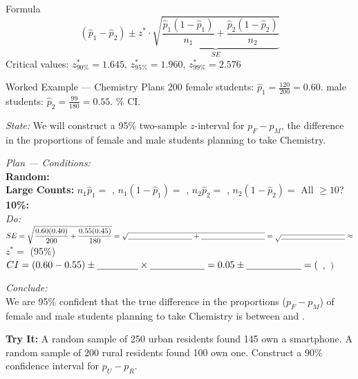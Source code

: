 \documentclass[10pt]{article}
\begin{document}
\begin{notesbox}{Formula}
\[(\hat p_1 - \hat p_2) \pm z^* \cdot \underbrace{\sqrt{\dfrac{\hat p_1(1-\hat p_1)}{n_1}
    + \dfrac{\hat p_2(1-\hat p_2)}{n_2}}}_{SE}\]
\vspace{4pt}
Critical values: $z^*_{90\%}=1.645$, \quad $z^*_{95\%}=1.960$, \quad $z^*_{99\%}=2.576$
\end{notesbox}

\begin{notesbox}{Worked Example --- Chemistry Plans}
200 female students: $\hat p_1 = \frac{120}{200} = 0.60$.  male students: $\hat p_2 = \frac{99}{180} = 0.55$. \% CI.

\textit{State:} We will construct a 95\% two-sample $z$-interval for $p_F - p_M$, the difference
in the proportions of female and male students planning to take Chemistry.

\textit{Plan --- Conditions:}\\
\textbf{Random:} \blank{7cm} \\
\textbf{Large Counts:} $n_1\hat p_1 = $ \blank{2cm}, $n_1(1-\hat p_1) = $ \blank{2cm},
$n_2\hat p_2 = $ \blank{2cm}, $n_2(1-\hat p_2) = $ \blank{2cm} \quad All $\ge 10$? \blank{1.5cm}\\
\textbf{10\%:} \blank{7cm} \\[4pt]

\textit{Do:}\\
$SE = \sqrt{\dfrac{0.60(0.40)}{200}+\dfrac{0.55(0.45)}{180}}
     = \sqrt{\blank{3cm}+\blank{3cm}} = \sqrt{\blank{3cm}} \approx $ \blank{2cm} \\[8pt]
$z^* = $ \blank{1.5cm} \quad (95\%)\\[4pt]
$CI = (0.60 - 0.55) \pm \blank{1.5cm}\times\blank{2cm} = 0.05 \pm \blank{2cm}
    = ($ \blank{2.5cm}$,$ \blank{2.5cm}$)$

\textit{Conclude:}\\
We are 95\% confident that the true difference in the proportions ($p_F - p_M$) of female
and male students planning to take Chemistry is between \blank{2cm} and \blank{2cm}.
\end{notesbox}

\begin{practicebox}
\textbf{Try It:} A random sample of 250 urban residents found 145 own a smartphone.
A random sample of 200 rural residents found 100 own one.
Construct a 90\% confidence interval for $p_U - p_R$.
\end{practicebox}
\end{document}
